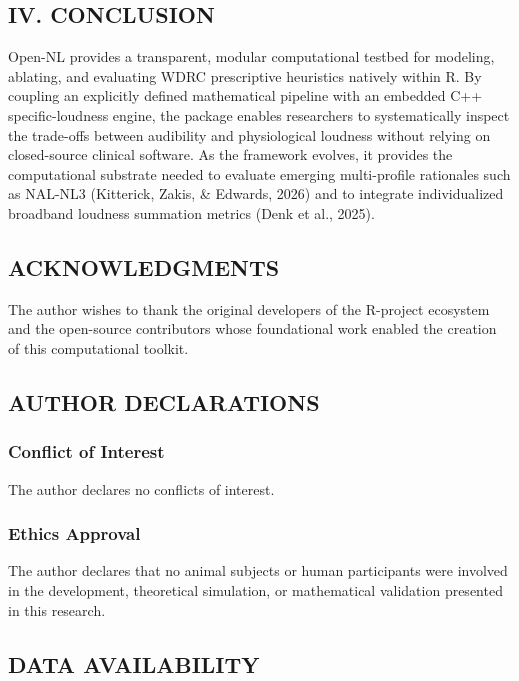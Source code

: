 \documentclass[
  12pt,
]{article}
\begin{document}
\subsection{IV. CONCLUSION}\label{iv.-conclusion}

Open-NL provides a transparent, modular computational testbed for
modeling, ablating, and evaluating WDRC prescriptive heuristics natively
within R. By coupling an explicitly defined mathematical pipeline with
an embedded C++ specific-loudness engine, the package enables
researchers to systematically inspect the trade-offs between audibility
and physiological loudness without relying on closed-source clinical
software. As the framework evolves, it provides the computational
substrate needed to evaluate emerging multi-profile rationales such as
NAL-NL3 (Kitterick, Zakis, \& Edwards, 2026) and to integrate
individualized broadband loudness summation metrics (Denk et al., 2025).

\subsection{ACKNOWLEDGMENTS}\label{acknowledgments}

The author wishes to thank the original developers of the R-project
ecosystem and the open-source contributors whose foundational work
enabled the creation of this computational toolkit.

\subsection{AUTHOR DECLARATIONS}\label{author-declarations}

\subsubsection{Conflict of Interest}\label{conflict-of-interest}

The author declares no conflicts of interest.

\subsubsection{Ethics Approval}\label{ethics-approval}

The author declares that no animal subjects or human participants were
involved in the development, theoretical simulation, or mathematical
validation presented in this research.

\subsection{DATA AVAILABILITY}\label{data-availability}
\end{document}
